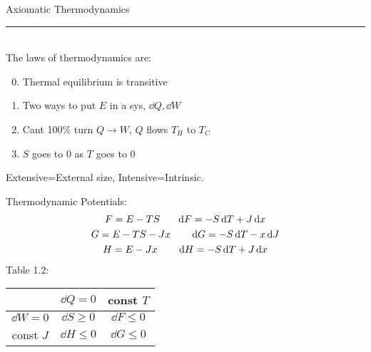 \documentclass[8pt]{article}
\begin{document}
\small
\begin{multicols*}{2}
  \begin{center}
    \normalsize{Axiomatic Thermodynamics}
  \end{center}
    \hrule~\\
  The laws of thermodynamics are:
  \begin{enumerate}
  \setcounter{enumi}{-1}
  \item Thermal equilibrium is transitive
  \item Two ways to put $E$ in a sys, $\dd{Q},\dd{W}$
  \item Cant 100\% turn $Q\to W$, $Q$ flows $T_H$ to $T_C$
  \item $S$ goes to 0 as $T$ goes to 0
  \end{enumerate}
  Extensive=External size, Intensive=Intrinsic.

  Thermodynamic Potentials:
  \begin{gather*}
    \footnotesize
    F=E-TS \qquad \dd{F}=-S\dd{T}+J\dd{x}\\
    G=E-TS-Jx \qquad \dd{G}=-S\dd{T}-x\dd{J}\\
    H=E-Jx \qquad \dd{H}=-S\dd{T}+J\dd{x}
  \end{gather*}
  Table 1.2:
  \begin{table}[H]
    \footnotesize
    \centering
    \begin{tabular}{|c|cc|}
      \hline&$\dd{Q}=0$ & const $T$ \\\hline
      $\dd{W}=0$ & $\dd{S}\geq0$ & $\dd{F}\leq0$\\
      const $J$ & $\dd{H}\leq0$ & $\dd{G}\leq0$ \\\hline
    \end{tabular}
  \end{table}


\end{multicols*}
\end{document}
